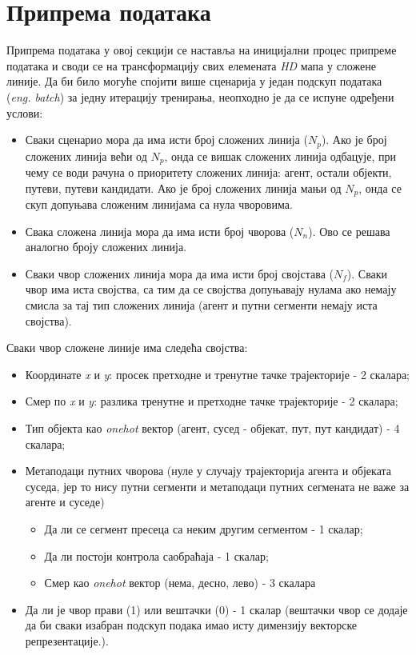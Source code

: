 \documentclass[11pt,oneside]{memoir}
\begin{document}
\section{Припрема података}

Припрема података у овој секцији се наставља на иницијални процес припреме података и своди се на трансформацију свих елемената
\textit{HD} мапа у сложене линије. Да би било могуће спојити више сценарија у један подскуп података (\textit{eng. batch}) 
за једну итерацију тренирања, неопходно је да се испуне одређени услови:
\begin{itemize}
  \item Сваки сценарио мора да има исти број сложених линија ($N_{p}$). Ако је број сложених линија већи од $N_{p}$, онда се 
        вишак сложених линија одбацује, при чему се води рачуна о приоритету сложених линија: агент, остали објекти, путеви, путеви кандидати.
        Ако је број сложених линија мањи од $N_{p}$, онда се скуп допуњава сложеним линијама са нула чворовима.
  \item Свака сложена линија мора да има исти број чворова ($N_{n}$). Ово се решава аналогно броју сложених линија.
  \item Сваки чвор сложених линија мора да има исти број својстава ($N_{f}$). Сваки чвор има иста својства, са тим
        да се својства допуњавају нулама ако немају смисла за тај тип сложених линија (агент и путни сегменти немају иста својства).
\end{itemize}

\noindent Сваки чвор сложене линије има следећа својства:
\begin{itemize}
  \item Координате \textit{x} и \textit{y}: просек претходне и тренутне тачке трајекторије - 2 скалара;
  \item Смер по \textit{x} и \textit{y}: разлика тренутне и претходне тачке трајекторије - 2 скалара;
  \item Тип објекта као \textit{onehot} вектор (агент, сусед - објекат, пут, пут кандидат) - 4 скалара;
  \item Метаподаци путних чворова (нуле у случају трајекторија агента и објеката суседа, јер то нису путни сегменти
        и метаподаци путних сегмената не важе за агенте и суседе)
    \begin{itemize}
      \item Да ли се сегмент пресеца са неким другим сегментом - 1 скалар;
      \item Да ли постоји контрола саобраћаја - 1 скалар;
      \item Смер као \textit{onehot} вектор (нема, десно, лево) - 3 скалара
    \end{itemize}
  \item Да ли је чвор прави (1) или вештачки (0) - 1 скалар (вештачки чвор се додаје да би сваки
        изабран подскуп подака имао исту димензију векторске репрезентације.).
\end{itemize}
\end{document}
